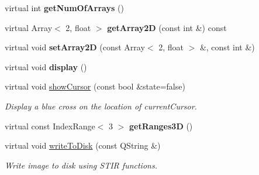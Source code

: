 \begin{DoxyCompactItemize}
\mbox{\label{classscreen__manager__ProjData_a58d3d2f090c5689a97efcb36aa58c15b}} 
virtual int {\bfseries get\+Num\+Of\+Arrays} ()
\item 
\mbox{\label{classscreen__manager__ProjData_a0e1ab26f7564884ba23b3c0ce2142bb5}} 
virtual Array$<$ 2, float $>$ {\bfseries get\+Array2D} (const int \&) const
\item 
\mbox{\label{classscreen__manager__ProjData_a4f22db3b2a9ee85009152f25c1a3f0b0}} 
virtual void {\bfseries set\+Array2D} (const Array$<$ 2, float $>$ \&, const int \&)
\item 
\mbox{\label{classscreen__manager__ProjData_a850f0d57175aa9673fe824db6e57e952}} 
virtual void {\bfseries display} ()
\item 
\mbox{\label{classscreen__manager__ProjData_ae1fdcefd945f20b14e436dbf90ce1997}} 
virtual void \mbox{\hyperlink{classscreen__manager__ProjData_ae1fdcefd945f20b14e436dbf90ce1997}{show\+Cursor}} (const bool \&state=false)
\begin{DoxyCompactList}\small\item\em Display a blue cross on the location of current\+Cursor. \end{DoxyCompactList}\item 
\mbox{\label{classscreen__manager__ProjData_a44ecc1dfc00cb24a71df9d221e0730d8}} 
virtual const Index\+Range$<$ 3 $>$ {\bfseries get\+Ranges3D} ()
\item 
\mbox{\label{classscreen__manager__ProjData_a65c0d425c740209a7b4128bc8ab7acd6}} 
virtual void \mbox{\hyperlink{classscreen__manager__ProjData_a65c0d425c740209a7b4128bc8ab7acd6}{write\+To\+Disk}} (const Q\+String \&)
\begin{DoxyCompactList}\small\item\em Write image to disk using S\+T\+IR functions. \end{DoxyCompactList}\item 
\mbox{\label{classscreen__manager__ProjData_af0ad4c677508a9b4448f2bca7e86a1e6}} 

\end{DoxyCompactItemize}
